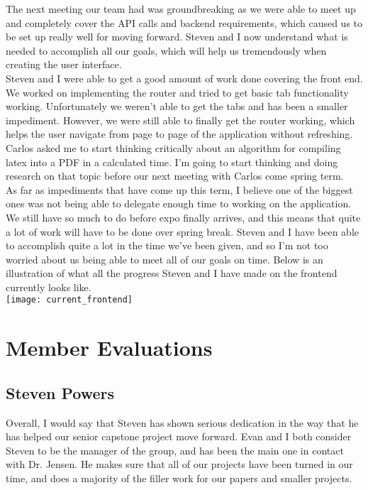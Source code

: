\documentclass[onecolumn, draftclsnofoot,10pt, compsoc]{IEEEtran}
\begin{document}
The next meeting our team had was groundbreaking as we were able to meet up and completely 
cover the API calls and backend requirements, which caused us to be set up really well for moving 
forward. Steven and I now understand what is needed to accomplish all our goals, which will help us 
tremendously when creating the user interface. \\

Steven and I were able to get a good amount of work done covering the front end. We worked 
on implementing the router and tried to get basic tab functionality working. Unfortunately we weren't
 able to get the tabs and has been a smaller impediment. However, we were still able to finally get the
 router working, which helps the user navigate from page to page of the application without refreshing. 
 Carlos asked me to start thinking critically about an algorithm for compiling latex into a PDF in a 
 calculated time. I'm going to start thinking and doing research on that topic before our next meeting 
 with Carlos come spring term. \\

 As far as impediments that have come up this term, I believe one of the biggest ones was not 
 being able to delegate enough time to working on the application. We still have so much to do before 
 expo finally arrives, and this means that quite a lot of work will have to be done over spring break. 
 Steven and I have been able to accomplish quite a lot in the time we've been given, and so I'm not too 
 worried about us being able to meet all of our goals on time. Below is an illustration of what all the 
 progress Steven and I have made on the frontend currently looks like. \\

\texttt{[image: current\_frontend]}

\section{Member Evaluations}

\subsection{Steven Powers}
Overall, I would say that Steven has shown serious dedication in the way that he has helped our senior capstone project move forward. 
Evan and I both consider Steven to be the manager of the group, and has been the main one in contact with Dr. Jensen. He makes sure 
that all of our projects have been turned in our time, and does a majority of the filler work for our papers and smaller projects. \\
\end{document}
